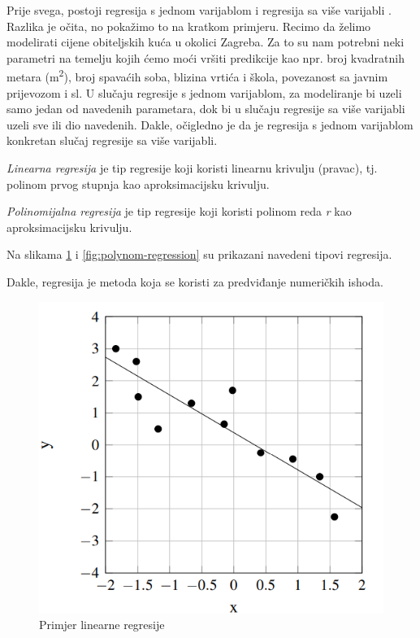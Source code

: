 \documentclass[times, utf8, zavrsni]{fer}
\begin{document}
Prije svega, postoji regresija s jednom varijablom  i regresija sa više varijabli . Razlika je očita, no pokažimo to na kratkom primjeru. Recimo da želimo modelirati cijene obiteljskih kuća u okolici Zagreba. Za to su nam potrebni neki parametri na temelju kojih ćemo moći vršiti predikcije kao npr. broj kvadratnih metara (m\textsuperscript{2}), broj spavaćih soba, blizina vrtića i škola, povezanost sa javnim prijevozom i sl. U slučaju regresije s jednom varijablom, za modeliranje bi uzeli samo jedan od navedenih parametara, dok bi u slučaju regresije sa više varijabli uzeli sve ili dio navedenih. Dakle, očigledno je da je regresija s jednom varijablom konkretan slučaj regresije sa više varijabli.

\bigskip

\textit{Linearna regresija}  je tip regresije koji koristi linearnu krivulju (pravac), tj. polinom prvog stupnja kao aproksimacijsku krivulju.

\textit{Polinomijalna regresija}  je tip regresije koji koristi polinom reda \textit{r} kao aproksimacijsku krivulju.

Na slikama \ref{fig:linear-regression} i \ref{fig:polynom-regression} su prikazani navedeni tipovi regresija.

\bigskip

Dakle, regresija je metoda koja se koristi za predviđanje numeričkih ishoda.

\begin{figure}[H]
    \centering
    \includegraphics[scale=0.75]{img/linear-regression.png}
    \caption[Caption for LOF]{Primjer linearne regresije\footnotemark}
    \label{fig:linear-regression}
\end{figure}
\end{document}
